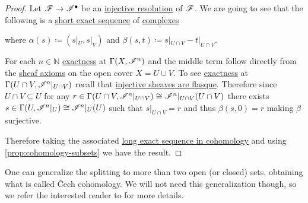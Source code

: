 \documentclass[../../main]{subfiles}
\begin{document}
\begin{proof}
  Let \(\mathscr{F} \to \mathscr{I}^{\bullet}\) be an \hyperref[def:resolution]{injective resolution} of \(\mathscr{F}\).
  We are going to see that the following is a \hyperref[def:exact-sequence]{short exact sequence} of \hyperref[def:complex]{complexes}
  \begin{center}
  \end{center}
  where \(\alpha(s) \coloneq (s|_{U}, s|_{V})\) and \(\beta(s, t) \coloneq s|_{U \cap V} - t|_{U \cap V}\).
  
  For each \(n \in \mathbb{N}\) \hyperref[def:exact-sequence]{exactness} at \(\Gamma(X, \mathscr{I}^{n})\) and the middle term follow directly from the \hyperref[def:sheaf]{sheaf axioms} on the open cover \(X = U \cup V\).
  To see \hyperref[def:exact-sequence]{exactness} at \(\Gamma(U \cap V, \mathscr{I}^{n}|_{U \cap V})\) recall that \hyperref[lemma:injective-sheaves-are-flasque]{injective sheaves are flasque}.
  Therefore since \(U \cap V \subseteq U\) for any \(r \in \Gamma(U \cap V, \mathscr{I}^{n}|_{U \cap V}) \cong \mathscr{I}^{n}|_{U \cap V}(U \cap V)\) there exists \(s \in \Gamma(U, \mathscr{I}^{n}|_{U}) \cong \mathscr{I}^{n}|_{U}(U)\) such that \(s|_{U \cap V} = r\) and thus \(\beta(s, 0) = r\) making \(\beta\) surjective.

  Therefore taking the associated \hyperref[thm:LES-in-cohomology]{long exact sequence in cohomology} and using \autoref{prop:cohomology-subsets} we have the result.
\end{proof}

\begin{remark}
  One can generalize the splitting to more than two open (or closed) sets, obtaining what is called \v{C}ech cohomology.
  We will not need this generalization though, so we refer the interested reader to \cite[\href{https://stacks.math.columbia.edu/tag/01ED}{Section 01ED}]{stacks-project} for more details.
\end{remark}
\end{document}
